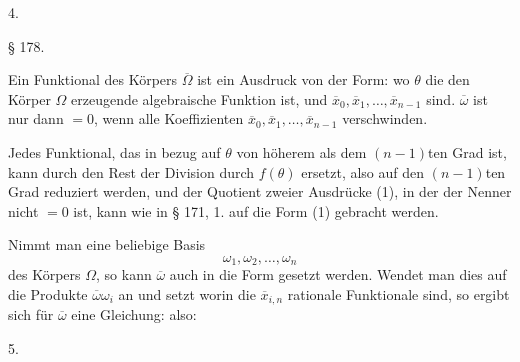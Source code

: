 
4. 


\begin{center}
§ 178.\\
\end{center}

Ein Funktional des Körpers $\overline{\Omega}$ ist ein Ausdruck von der Form:
wo $\theta$ die den Körper $\Omega$ erzeugende algebraische Funktion ist, und $\overline{x}_0, \overline{x}_1, \ldots, \overline{x}_{n-1}$  sind. $\overline{\omega}$ ist nur dann $= 0$, wenn alle Koeffizienten $\overline{x}_0, \overline{x}_1, \ldots, \overline{x}_{n-1}$ verschwinden.

Jedes Funktional, das in bezug auf $\theta$ von höherem als dem $(n-1)$ten Grad ist, kann durch den Rest der Division durch $f(\theta)$ ersetzt, also auf den $(n-1)$ten Grad reduziert werden, und der Quotient zweier Ausdrücke (1), in der der Nenner nicht $=0$ ist, kann wie in § 171, 1. auf die Form (1) gebracht werden.

Nimmt man eine beliebige Basis
\[
\omega_1, \omega_2, \ldots, \omega_n
\]
des Körpers $\Omega$, so kann $\overline{\omega}$ auch in die Form
gesetzt werden. Wendet man dies auf die Produkte $\overline{\omega}\omega_i$ an und setzt
worin die $\overline{x}_{i,n}$ rationale Funktionale sind, so ergibt sich für $\overline{\omega}$ eine Gleichung:
also:

5. 
